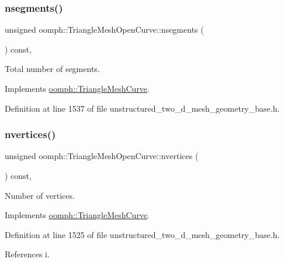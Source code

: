 \subsubsection{\texorpdfstring{nsegments()}{nsegments()}}
{\footnotesize\ttfamily unsigned oomph\+::\+Triangle\+Mesh\+Open\+Curve\+::nsegments (\begin{DoxyParamCaption}{ }\end{DoxyParamCaption}) const\hspace{0.3cm}{\ttfamily [inline]}, {\ttfamily [virtual]}}



Total number of segments. 



Implements \hyperlink{classoomph_1_1TriangleMeshCurve_abb1f60baf8d94f54f409ae51417e2568}{oomph\+::\+Triangle\+Mesh\+Curve}.



Definition at line 1537 of file unstructured\+\_\+two\+\_\+d\+\_\+mesh\+\_\+geometry\+\_\+base.\+h.

\mbox{\label{classoomph_1_1TriangleMeshOpenCurve_ac9671f91a0433ec5cab5a3b7dac45261}} 
\subsubsection{\texorpdfstring{nvertices()}{nvertices()}}
{\footnotesize\ttfamily unsigned oomph\+::\+Triangle\+Mesh\+Open\+Curve\+::nvertices (\begin{DoxyParamCaption}{ }\end{DoxyParamCaption}) const\hspace{0.3cm}{\ttfamily [inline]}, {\ttfamily [virtual]}}



Number of vertices. 



Implements \hyperlink{classoomph_1_1TriangleMeshCurve_acf002aab11af44361b39729d067efbe2}{oomph\+::\+Triangle\+Mesh\+Curve}.



Definition at line 1525 of file unstructured\+\_\+two\+\_\+d\+\_\+mesh\+\_\+geometry\+\_\+base.\+h.



References i.

